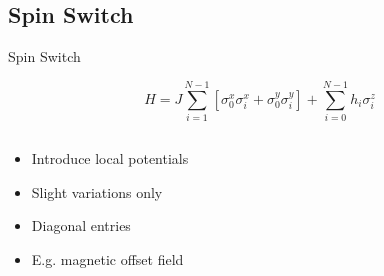 \documentclass{beamer}
\begin{document}
\subsection{Spin Switch}
\begin{frame}[t]{Spin Switch}
	\begin{exampleblock}{}
	\setlength\abovedisplayskip{-8pt}
	\begin{center}
		\[ H = J\sum_{i=1}^{N-1}\left[\sigma_0^x\sigma_i^x + \sigma_0^y\sigma_i^y\right] + \sum_{i=0}^{N-1}h_i\sigma_i^z \]
	\end{center}
	\end{exampleblock}
	\begin{columns}[T]
		\begin{column}{0.5\textwidth}
			\centering
   			\begin{itemize}
				\item Introduce local potentials
				\item Slight variations only
				\item Diagonal entries 
				\item E.g. magnetic offset field
			\end{itemize}
		\end{column}
		\begin{column}{0.5\textwidth}
			\centering
		\end{column}
	\end{columns}
\end{frame}
\end{document}
